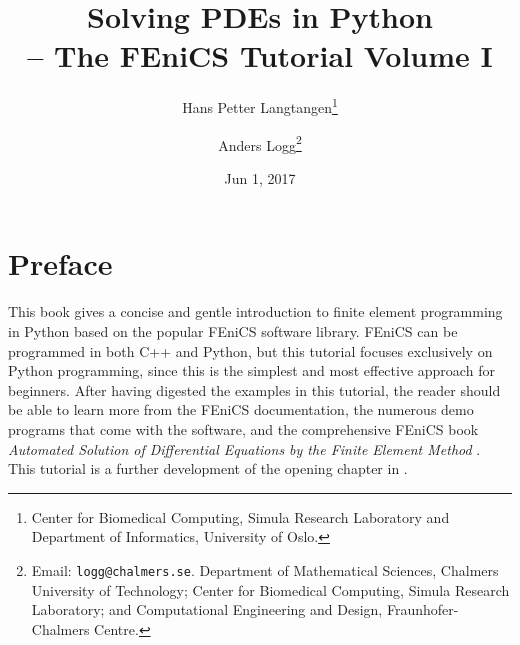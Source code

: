 \documentclass[graybox,envcountchap,sectrefs,final]{svmonodo}
\begin{document}

\newcommand{\exercisesection}[1]{\subsection*{#1}}







\frontmatter
\setcounter{page}{3}
\pagestyle{headings}



\title{Solving PDEs in Python \\ -- The FEniCS Tutorial Volume I}


\author{Hans Petter Langtangen\footnote{Center for Biomedical Computing, Simula Research Laboratory and Department of Informatics, University of Oslo.}
\and Anders Logg\footnote{Email: \texttt{logg@chalmers.se}. Department of Mathematical Sciences, Chalmers University of Technology; Center for Biomedical Computing, Simula Research Laboratory; and Computational Engineering and Design, Fraunhofer-Chalmers Centre.}}


\date{Jun 1, 2017}
\maketitle



\tableofcontents


\vspace{1cm} %

\mainmatter




\chapter*{Preface}

This book gives a concise and gentle introduction to finite element
programming in Python based on the popular FEniCS software library.
FEniCS can be programmed in both C++ and Python, but this tutorial
focuses exclusively on Python programming, since this is the simplest
and most effective approach for beginners. After having digested the
examples in this tutorial, the reader should be able to learn more
from the FEniCS documentation, the numerous demo programs that come
with the software, and the comprehensive FEniCS book \emph{Automated
Solution of Differential Equations by the Finite Element Method}
\cite{FEniCS}. This tutorial is a further development of the opening
chapter in \cite{FEniCS}.
\end{document}
